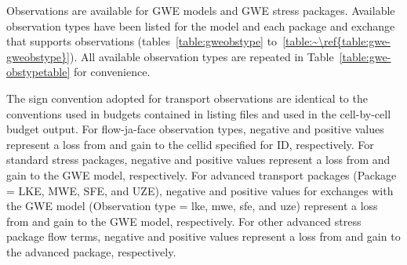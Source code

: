 Observations are available for GWE models and GWE stress packages. Available observation types have been listed for the model and each package and exchange that supports observations (tables~\ref{table:gweobstype} to~\ref{table:~\ref{table:gwe-gweobstype}}). All available observation types are repeated in Table~\ref{table:gwe-obstypetable} for convenience. 

The sign convention adopted for transport observations are identical to the conventions used in budgets contained in listing files and used in the cell-by-cell budget output. For flow-ja-face observation types, negative and positive values represent a loss from and gain to the cellid specified for ID, respectively. For standard stress packages, negative and positive values represent a loss from and gain to the GWE model, respectively. For advanced transport packages (Package = LKE, MWE, SFE, and UZE), negative and positive values for exchanges with the GWE model (Observation type = lke, mwe, sfe, and uze) represent a loss from and gain to the GWE model, respectively. For other advanced stress package flow terms, negative and positive values represent a loss from and gain to the advanced package, respectively.

\FloatBarrier

\FloatBarrier
